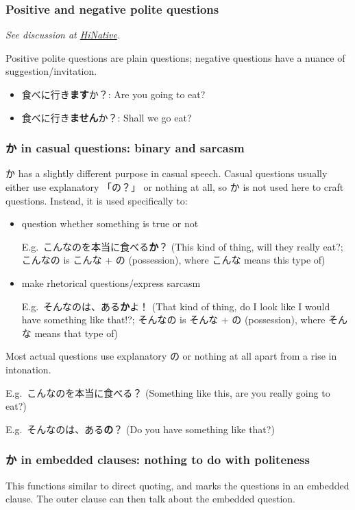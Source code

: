 \documentclass[../nihongo-gakushuu-kyouzai.tex]{subfiles}
\begin{document}
\subsubsection{Positive and negative polite questions} \label{sec:positive-negative-questions}
\emph{See discussion at \href{https://ja.hinative.com/questions/16031339}{HiNative}.}

Positive polite questions are plain questions; negative questions have a nuance of suggestion/invitation.
\begin{itemize}
    \item 食べに行き\textbf{ます}か？: Are you going to eat?
    \item 食べに行き\textbf{ません}か？: Shall we go eat?
\end{itemize}

\subsubsection{か in casual questions: binary and sarcasm}
か has a slightly different purpose in casual speech. Casual questions usually either use explanatory 「の？」 or nothing at all, so か is not used here to craft questions. Instead, it is used specifically to:
\begin{itemize}
    \item question whether something is true or not

    E.g.\ こんなのを本当に食べる\textbf{か}？ (This kind of thing, will they really eat?; こんなの is こんな + の (possession), where こんな means this type of)

    \item make rhetorical questions/express sarcasm

    E.g.\ そんなのは、ある\textbf{か}よ！ (That kind of thing, do  I look like I would have something like that!?; そんなの is そんな + の (possession), where そんな means that type of)
\end{itemize}
Most actual questions use explanatory の or nothing at all apart from a rise in intonation.

E.g.\ こんなのを本当に食べる？ (Something like this, are you really going to eat?)

E.g.\ そんなのは、ある\textbf{の}？ (Do you have something like that?)

\subsubsection{か in embedded clauses: nothing to do with politeness}
This functions similar to direct quoting, and marks the questions in an embedded clause. The outer clause can then talk about the embedded question.
\end{document}
